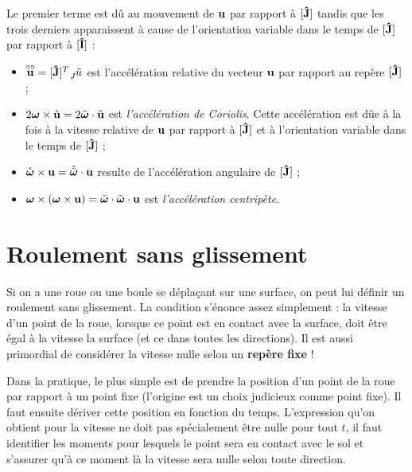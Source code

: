 Le premier terme est dû au mouvement de ${\bf u}$ par rapport à $[{\bf\hat{J}}]$ tandis que les trois derniers apparaissent à cause de l'orientation variable dans le temps de $[{\bf\hat{J}}]$ par rapport à $[{\bf\hat{I}}]$ :

\begin{itemize}
	\item $\fvrr{u} = [\uj]^T \wrt{J}{\ddot{u}}$ est l'accélération relative du vecteur ${\bf u}$ par rapport au repère $[{\bf\hat{J}}]$ ;
	\item $2 {\bm \omega} \times \mathring{\bf u} = 2 \tilde{\bm \omega} \cdot \mathring{\bf u}$ est \textit{l'accélération de Coriolis}. Cette accélération est dûe à la fois à la vitesse relative de ${\bf u}$ par rapport à $[{\bf\hat{J}}]$ et à l'orientation variable dans le temps de $[{\bf\hat{J}}]$ ;
	\item $\mathring{\bm \omega} \times {\bf u} = \mathring{\tilde{\bm \omega}} \cdot {\bf u}$ resulte de l'accélération angulaire de $[{\bf\hat{J}}]$ ;
	\item ${\bm \omega} \times ({\bm \omega} \times {\bf u}) = \tilde{\bm \omega} \cdot \tilde{\bm \omega} \cdot {\bf u}$ est 
	\textit{l'accélération centripète}.
\end{itemize}

\section{Roulement sans glissement}

Si on a une roue ou une boule se déplaçant sur une surface, on peut lui définir un roulement sans glissement.
La condition s'énonce assez simplement :
la vitesse d'un point de la roue, lorsque ce point est en contact avec la surface, doit
être égal à la vitesse la surface (et ce dans toutes les directions).
Il est aussi primordial de considérer la vitesse nulle selon un {\bf repère fixe} !

Dans la pratique, le plus simple est de prendre la position d'un point de la roue par rapport à un point fixe (l'origine est un choix judicieux comme point fixe).
Il faut ensuite dériver cette position en fonction du temps.
L'expression qu'on obtient pour la vitesse ne doit pas spécialement être nulle pour tout $t$, il faut identifier les moments pour lesquels le point sera en contact avec le sol et s'assurer qu'à ce moment là la vitesse sera nulle selon toute direction.


